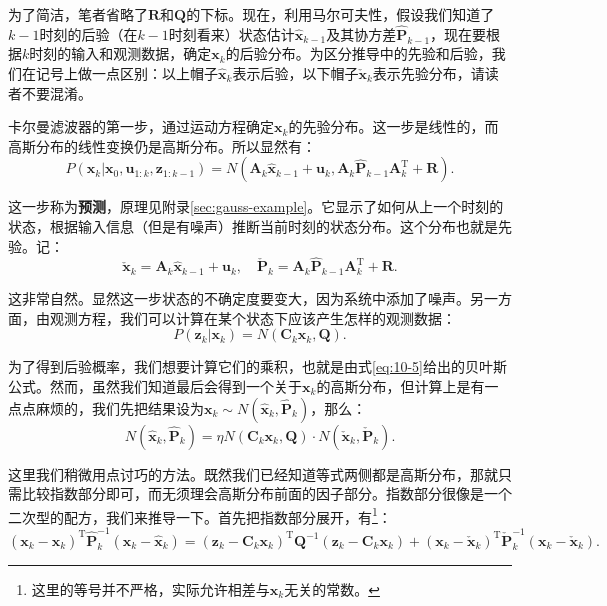 为了简洁，笔者省略了$\bm{R}$和$\bm{Q}$的下标。现在，利用马尔可夫性，假设我们知道了$k-1$时刻的后验（在$k-1$时刻看来）状态估计$\bm{\hat{x}}_{k-1}$及其协方差$\bm{\hat{P}}_{k-1}$，现在要根据$k$时刻的输入和观测数据，确定$\bm{x}_k$的后验分布。为区分推导中的先验和后验，我们在记号上做一点区别：以上帽子$\bm{\hat{x}}_k$表示后验，以下帽子$\check{\bm{x}}_k$表示先验分布，请读者不要混淆。

卡尔曼滤波器的第一步，通过运动方程确定$\bm{x}_k$的先验分布。这一步是线性的，而高斯分布的线性变换仍是高斯分布。所以显然有：
\begin{equation}
P\left( {{\bm{x}_k}|{\bm{x}_0},{\bm{u}_{1:k}},{\bm{z}_{1:k - 1}}} \right) = N\left( {\bm{A}_k {{\hat{\bm{x}}}_{k - 1}} + {\bm{u}_k}, \bm{A}_k\hat{\bm{P}}_{k-1} {\bm{A}_k^\mathrm{T}} + \bm{R}} \right).
\end{equation}

这一步称为\textbf{预测}，原理见附录\ref{sec:gauss-example}。它显示了如何从上一个时刻的状态，根据输入信息（但是有噪声）推断当前时刻的状态分布。这个分布也就是先验。记：
\begin{equation}
\check{\bm{x}}_k = {\bm{A}_k {{\hat{\bm{x}}}_{k - 1}} + {\bm{u}_k}}, \quad \check{\bm{P}}_k = {\bm{A}_k \hat{\bm{P}}_{k-1} { \bm{A}^\mathrm{T}_k} + \bm{R}}.
\end{equation}

这非常自然。显然这一步状态的不确定度要变大，因为系统中添加了噪声。另一方面，由观测方程，我们可以计算在某个状态下应该产生怎样的观测数据：
\begin{equation}
P\left( {{\bm{z}_k}|{\bm{x}_k}} \right) = N\left( {{\bm{C}_k}{\bm{x}_k},\bm{Q}} \right) .
\end{equation}

为了得到后验概率，我们想要计算它们的乘积，也就是由式\eqref{eq:10-5}给出的贝叶斯公式。然而，虽然我们知道最后会得到一个关于$\bm{x}_k$的高斯分布，但计算上是有一点点麻烦的，我们先把结果设为$\bm{x}_k \sim N(\bm{\hat{x}}_k, \bm{\hat{P}}_k )$，那么：
\begin{equation}
N(\bm{\hat{x}}_k, \bm{\hat{P}}_k ) = \eta N\left( {{\bm{C}_k}{\bm{x}_k},\bm{Q}} \right) \cdot N( \bm{\check{x}}_k, \bm{\check{P}}_k). 
\end{equation}

这里我们稍微用点讨巧的方法。既然我们已经知道等式两侧都是高斯分布，那就只需比较指数部分即可，而无须理会高斯分布前面的因子部分。指数部分很像是一个二次型的配方，我们来推导一下。首先把指数部分展开，有\footnote{这里的等号并不严格，实际允许相差与$\bm{x}_k$无关的常数。}：
\begin{equation}
{\left( {{\bm{x}_k} - {{\hat{\bm{x}}}_k}} \right)^\mathrm{T}}\hat{\bm{P}}_k^{ - 1}\left( {{\bm{x}_k} - {{\hat{\bm{x}}}_k}} \right) = {\left( {{\bm{z}_k} - {\bm{C}_k} {\bm{x}_k}} \right)^\mathrm{T}}{\bm{Q}^{ - 1}}\left( {{\bm{z}_k} - {\bm{C}_k}{\bm{x}_k}} \right) + {\left( {{\bm{x}_k} - {{\check{\bm{x}}}_k}} \right)^\mathrm{T}}\check{\bm{P}}_k^{ - 1}\left( {\bm{x}_k - {{\check{\bm{x}}}_k}} \right).
\end{equation}

